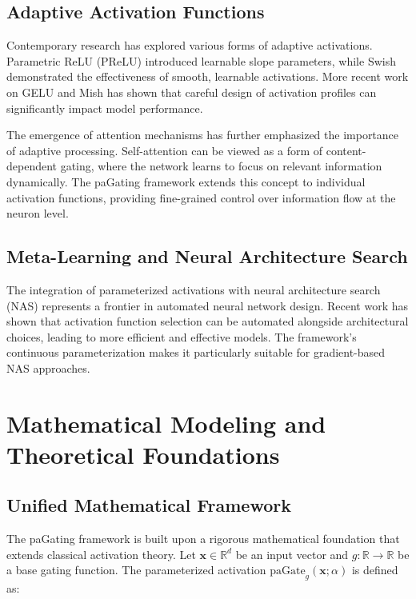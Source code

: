 \documentclass[lettersize,journal]{IEEEtran}
\begin{document}
\subsection{Adaptive Activation Functions}
Contemporary research has explored various forms of adaptive activations. Parametric ReLU (PReLU) \cite{he2015delving} introduced learnable slope parameters, while Swish \cite{ramachandran2017searching} demonstrated the effectiveness of smooth, learnable activations. More recent work on GELU \cite{hendrycks2016gaussian} and Mish \cite{misra2019mish} has shown that careful design of activation profiles can significantly impact model performance.

The emergence of attention mechanisms \cite{vaswani2017attention} has further emphasized the importance of adaptive processing. Self-attention can be viewed as a form of content-dependent gating, where the network learns to focus on relevant information dynamically. The paGating framework extends this concept to individual activation functions, providing fine-grained control over information flow at the neuron level.

\subsection{Meta-Learning and Neural Architecture Search}
The integration of parameterized activations with neural architecture search (NAS) represents a frontier in automated neural network design. Recent work has shown that activation function selection can be automated alongside architectural choices, leading to more efficient and effective models. The framework's continuous parameterization makes it particularly suitable for gradient-based NAS approaches.

\section{Mathematical Modeling and Theoretical Foundations}
\label{sec:mathematical}

\subsection{Unified Mathematical Framework}
The paGating framework is built upon a rigorous mathematical foundation that extends classical activation theory. Let $\mathbf{x} \in \mathbb{R}^d$ be an input vector and $g: \mathbb{R} \to \mathbb{R}$ be a base gating function. The parameterized activation $\text{paGate}_g(\mathbf{x}; \alpha)$ is defined as:
\end{document}
